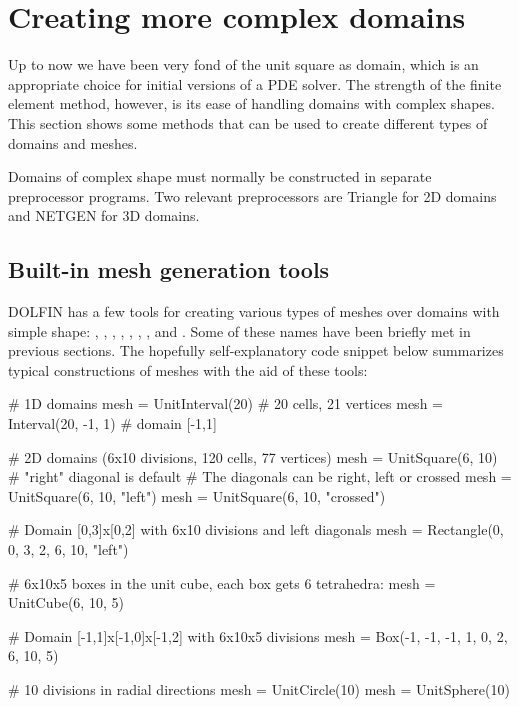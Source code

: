 \section{Creating more complex domains}
\label{langtangen:prepro}

Up to now we have been very fond of the unit square as domain, which is
an appropriate choice for initial versions of a PDE solver. The strength
of the finite element method, however, is its ease of handling domains
with complex shapes. This section shows some methods that can be used
to create different types of domains and meshes.

Domains of complex shape must normally be constructed in separate
preprocessor programs. Two relevant preprocessors are Triangle for 2D
domains and NETGEN for 3D domains.

\subsection{Built-in mesh generation tools}
\label{langtangen:prepro:builtin}

DOLFIN has a few tools for creating various types of meshes over domains
with simple shape:
,
,
,
,
,
,
,
and
.
Some of these names have been briefly met in previous sections.
The hopefully self-explanatory code snippet below summarizes typical
constructions of meshes with the aid of these tools:
\begin{python}
# 1D domains
mesh = UnitInterval(20)     # 20 cells, 21 vertices
mesh = Interval(20, -1, 1)  # domain [-1,1]

# 2D domains (6x10 divisions, 120 cells, 77 vertices)
mesh = UnitSquare(6, 10)  # "right" diagonal is default
# The diagonals can be right, left or crossed
mesh = UnitSquare(6, 10, "left")
mesh = UnitSquare(6, 10, "crossed")

# Domain [0,3]x[0,2] with 6x10 divisions and left diagonals
mesh = Rectangle(0, 0, 3, 2, 6, 10, "left")

# 6x10x5 boxes in the unit cube, each box gets 6 tetrahedra:
mesh = UnitCube(6, 10, 5)

# Domain [-1,1]x[-1,0]x[-1,2] with 6x10x5 divisions
mesh = Box(-1, -1, -1, 1, 0, 2, 6, 10, 5)

# 10 divisions in radial directions
mesh = UnitCircle(10)
mesh = UnitSphere(10)
\end{python}

